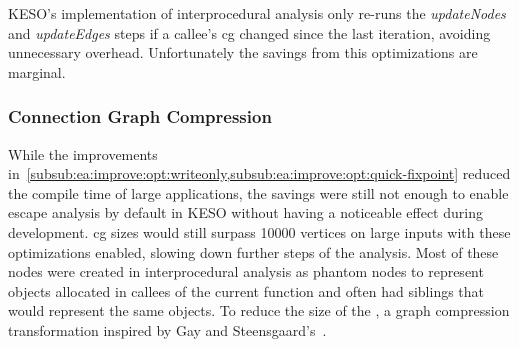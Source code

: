 				KESO's implementation of interprocedural analysis only re-runs the \emph{updateNodes} and \emph{updateEdges}
				steps if a callee's \gls{cg} changed since the last iteration, avoiding unnecessary overhead. Unfortunately the
				savings from this optimizations are marginal.

			\subsubsection{Connection Graph Compression}
				\label{subsub:ea:improve:opt:compression}
				While the improvements in~\cref{subsub:ea:improve:opt:writeonly,subsub:ea:improve:opt:quick-fixpoint} reduced
				the compile time of large applications, the savings were still not enough to enable escape analysis by default
				in KESO without having a noticeable effect during development. \Acrlong{cg} sizes would still surpass 10000
				vertices on large inputs with these optimizations enabled, slowing down further steps of the analysis. Most of
				these nodes were created in interprocedural analysis as phantom nodes to represent objects allocated in callees
				of the current function and often had siblings that would represent the same objects. To reduce the size of the
				, a graph compression transformation inspired by Gay and Steensgaard's~\cite{gay:00:cc}.

